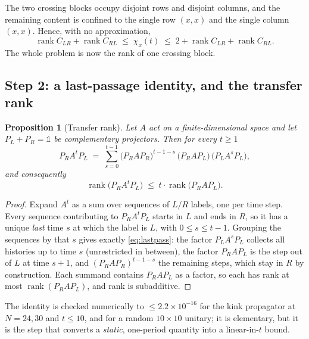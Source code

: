 \documentclass[11pt]{article}
\theoremstyle{plain}
\newtheorem{proposition}{Proposition}
\theoremstyle{remark}
\begin{document}
\noindent The two crossing blocks occupy disjoint rows and disjoint columns, and
the remaining content is confined to the single row $(x,x)$ and the single
column $(x,x)$. Hence, with no approximation,
\begin{equation}
  \operatorname{rank}C_{LR} + \operatorname{rank}C_{RL}
  \;\le\; \chi_x(t) \;\le\;
  2 + \operatorname{rank}C_{LR} + \operatorname{rank}C_{RL}.
  \label{eq:sandwich}
\end{equation}
The whole problem is now the rank of one crossing block.

\subsection{Step 2: a last-passage identity, and the transfer rank}

\begin{proposition}[Transfer rank]
\label{prop:transfer}
Let $A$ act on a finite-dimensional space and let $P_L + P_R = \mathbb 1$ be
complementary projectors. Then for every $t\ge1$
\begin{equation}
  P_R A^t P_L \;=\; \sum_{s=0}^{t-1}
    \big(P_R A P_R\big)^{t-1-s}\,\big(P_R A P_L\big)\,\big(P_L A^{s} P_L\big),
  \label{eq:lastpass}
\end{equation}
and consequently
\[
  \operatorname{rank}\big(P_R A^t P_L\big)
  \;\le\; t\cdot\operatorname{rank}\big(P_R A P_L\big).
\]
\end{proposition}

\begin{proof}
Expand $A^t$ as a sum over sequences of $L/R$ labels, one per time step. Every
sequence contributing to $P_RA^tP_L$ starts in $L$ and ends in $R$, so it has a
unique \emph{last} time $s$ at which the label is $L$, with $0\le s\le t-1$.
Grouping the sequences by that $s$ gives exactly \eqref{eq:lastpass}: the factor
$P_LA^sP_L$ collects all histories up to time $s$ (unrestricted in between), the
factor $P_RAP_L$ is the step out of $L$ at time $s+1$, and
$(P_RAP_R)^{t-1-s}$ the remaining steps, which stay in $R$ by construction. Each
summand contains $P_RAP_L$ as a factor, so each has rank at most
$\operatorname{rank}(P_RAP_L)$, and rank is subadditive.
\end{proof}

The identity is checked numerically to $\le 2.2\times10^{-16}$ for the kink
propagator at $N=24,30$ and $t\le10$, and for a random $10\times10$ unitary; it
is elementary, but it is the step that converts a \emph{static}, one-period
quantity into a linear-in-$t$ bound.
\end{document}
